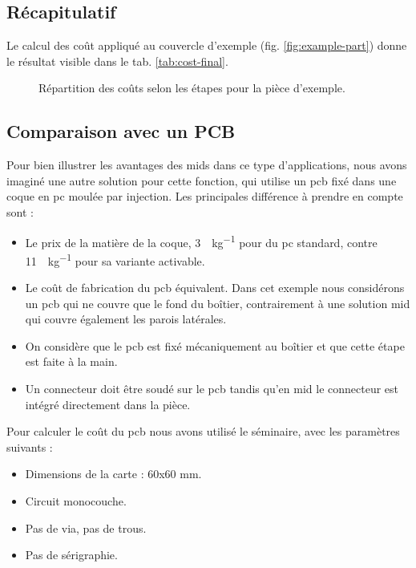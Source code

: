 

\subsection{Récapitulatif}
Le calcul des coût appliqué au couvercle d'exemple (fig. \ref{fig:example-part}) donne le résultat visible dans le tab. \ref{tab:cost-final}.


\begin{figure}[h!]

    \begin{center}
        \caption{Répartition des coûts selon les étapes pour la pièce d'exemple.}\label{fig:cost-repartition}
    \end{center}
\end{figure}

\subsection{Comparaison avec un PCB}
Pour bien illustrer les avantages des \glspl{mid} dans ce type d'applications, nous avons imaginé une autre solution pour cette fonction, qui utilise un \gls{pcb} fixé dans une coque en \gls{pc} moulée par injection.
Les principales différence à prendre en compte sont :
\begin{itemize}
    \item Le prix de la matière de la coque, \SI{3}{\chf\per\kilogram} pour du \gls{pc} standard, contre \SI{11}{\chf\per\kilogram} pour sa variante activable.
    \item Le coût de fabrication du \gls{pcb} équivalent.
        Dans cet exemple nous considérons un \gls{pcb} qui ne couvre que le fond du boîtier, contrairement à une solution \gls{mid} qui couvre également les parois latérales.
    \item On considère que le \gls{pcb} est fixé mécaniquement au boîtier et que cette étape est faite à la main.
    \item Un connecteur doit être soudé sur le \gls{pcb} tandis qu'en \gls{mid} le connecteur est intégré directement dans la pièce.
\end{itemize}

Pour calculer le coût du \gls{pcb} nous avons utilisé le séminaire\cite{pcb-2013}, avec les paramètres suivants :
\begin{itemize}
    \item Dimensions de la carte : 60x60 \si{\milli\meter}.
    \item Circuit monocouche.
    \item Pas de via, pas de trous.
    \item Pas de sérigraphie.
\end{itemize}

